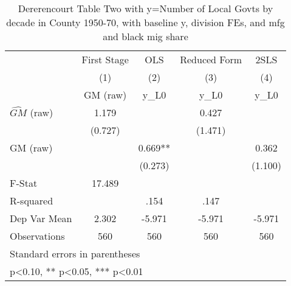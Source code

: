 \begin{table}[htbp]\centering
\def\sym#1{\ifmmode^{#1}\else\(^{#1}\)\fi}
\caption{Dererencourt Table Two with y=Number of Local Govts by decade in County 1950-70, with baseline y, division FEs, and mfg and black mig share}
\begin{tabular}{l*{4}{c}}
\toprule
                    & First Stage   &         OLS   &Reduced Form   &        2SLS   \\
                    &\multicolumn{1}{c}{(1)}&\multicolumn{1}{c}{(2)}&\multicolumn{1}{c}{(3)}&\multicolumn{1}{c}{(4)}\\
                    &\multicolumn{1}{c}{GM  (raw)}&\multicolumn{1}{c}{y\_L0}&\multicolumn{1}{c}{y\_L0}&\multicolumn{1}{c}{y\_L0}\\
\midrule
$\hat{GM}$ (raw)    &       1.179   &               &       0.427   &               \\
                    &     (0.727)   &               &     (1.471)   &               \\
\addlinespace
GM  (raw)           &               &       0.669** &               &       0.362   \\
                    &               &     (0.273)   &               &     (1.100)   \\
\midrule
F-Stat              &      17.489   &               &               &               \\
R-squared           &               &        .154   &        .147   &               \\
Dep Var Mean        &       2.302   &      -5.971   &      -5.971   &      -5.971   \\
Observations        &         560   &         560   &         560   &         560   \\
\bottomrule
\multicolumn{5}{l}{\footnotesize Standard errors in parentheses}\\
\multicolumn{5}{l}{\footnotesize * p<0.10, ** p<0.05, *** p<0.01}\\
\end{tabular}
\end{table}
